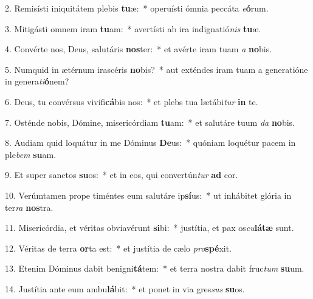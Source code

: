 2. Remisísti iniquitátem plebis \textbf{tu}æ:~*  operuísti ómnia peccáta \textit{e}\textbf{ó}rum.\

3. Mitigásti omnem iram \textbf{tu}am:~*  avertísti ab ira indignatió\textit{nis} \textbf{tu}æ.\

4. Convérte nos, Deus, salutáris \textbf{nos}ter:~*  et avérte iram tuam \textit{a} \textbf{no}bis.\

5. Numquid in ætérnum irascéris \textbf{no}bis?~*  aut exténdes iram tuam a generatióne in genera\textit{ti}\textbf{ó}nem?\

6. Deus, tu convérsus vivifi\textbf{cá}bis nos:~*  et plebs tua lætábi\textit{tur} \textbf{in} te.\

7. Osténde nobis, Dómine, misericórdiam \textbf{tu}am:~*  et salutáre tuum \textit{da} \textbf{no}bis.\

8. Audiam quid loquátur in me Dóminus \textbf{De}us:~*  quóniam loquétur pacem in ple\textit{bem} \textbf{su}am.\

9. Et super sanctos \textbf{su}os:~*  et in eos, qui convertún\textit{tur} \textbf{ad} cor.\

10. Verúmtamen prope timéntes eum salutáre ip\textbf{sí}us:~*  ut inhábitet glória in ter\textit{ra} \textbf{nos}tra.\

11. Misericórdia, et véritas obviavérunt \textbf{si}bi:~*  justítia, et pax os\textit{cu}\textbf{lá}\textbf{tæ} sunt.\

12. Véritas de terra \textbf{or}ta est:~*  et justítia de cælo \textit{pro}\textbf{spé}xit.\

13. Etenim Dóminus dabit benigni\textbf{tá}tem:~*  et terra nostra dabit fruc\textit{tum} \textbf{su}um.\

14. Justítia ante eum ambu\textbf{lá}bit:~*  et ponet in via gres\textit{sus} \textbf{su}os.\


